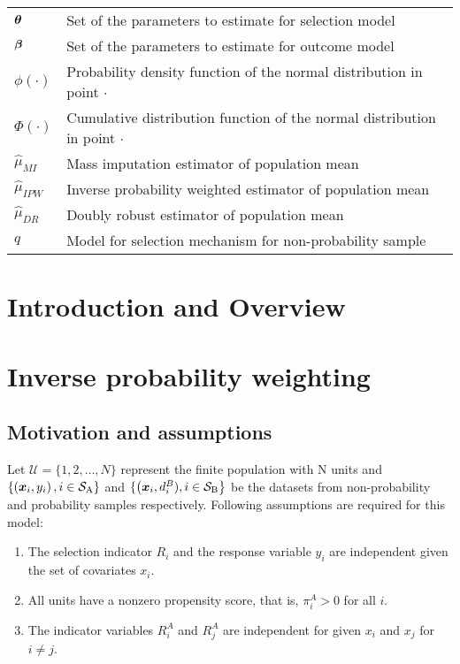 \documentclass[
  letterpaper,
  DIV=11,
  numbers=noendperiod]{scrreprt}
\begin{document}
\begin{longtable}[]{@{}
  >{\raggedright\arraybackslash}p{}
  >{\raggedright\arraybackslash}p{}@{}}
\(\boldsymbol{\theta}\) & Set of the parameters to estimate for selection model \\
\(\boldsymbol{\beta}\) & Set of the parameters to estimate for outcome model \\
\(\phi(\cdot)\) & Probability density function of the normal
distribution in point \(\cdot\) \\
\(\Phi(\cdot)\) & Cumulative distribution function of the normal
distribution in point \(\cdot\) \\
\(\hat{\mu}_{MI}\) & Mass imputation estimator of population mean \\
\(\hat{\mu}_{IPW}\) & Inverse probability weighted estimator of
population mean \\
\(\hat{\mu}_{DR}\) & Doubly robust estimator of population mean \\
\(q\) & Model for selection mechanism for non-probability sample \\
\bottomrule()
\end{longtable}


\hypertarget{introduction-and-overview}{%
\chapter{Introduction and Overview}\label{introduction-and-overview}}


\hypertarget{inverse-probability-weighting}{%
\chapter{Inverse probability
weighting}\label{inverse-probability-weighting}}

\hypertarget{motivation-and-assumptions}{%
\section{Motivation and assumptions}\label{motivation-and-assumptions}}

Let \(\mathcal{U}=\{1,2, \ldots, N\}\) represent the finite population
with N units and
\(\left\{\left(\boldsymbol{x}_i, y_i\right), i \in \mathcal{S}_{\mathrm{A}}\right\}\)
and \(\{\left(\boldsymbol{x}_i, d_i^B), i \in \mathcal{S}_{\mathrm{B}}\right\}\) be
the datasets from non-probability and probability samples respectively.
Following assumptions are required for this model:

\begin{enumerate}
\def\labelenumi{\arabic{enumi}.}
\item
  The selection indicator \(R_i\) and the response variable \(y_i\) are
  independent given the set of covariates \(x_i\).
\item
  All units have a nonzero propensity score, that is, \(\pi_i^A > 0\)
  for all \(i\).
\item
  The indicator variables \(R_i^A\) and \(R_j^A\) are independent for
  given \(x_i\) and \(x_j\) for \(i \neq j\).
\end{enumerate}
\end{document}
